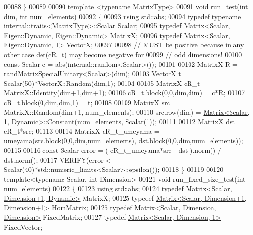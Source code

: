 \begin{DoxyCode}
00088 \}
00089 
00090 \textcolor{keyword}{template} <\textcolor{keyword}{typename} MatrixType>
00091 \textcolor{keywordtype}{void} run\_test(\textcolor{keywordtype}{int} dim, \textcolor{keywordtype}{int} num\_elements)
00092 \{
00093   \textcolor{keyword}{using} std::abs;
00094   \textcolor{keyword}{typedef} \textcolor{keyword}{typename} internal::traits<MatrixType>::Scalar Scalar;
00095   \textcolor{keyword}{typedef} \hyperlink{group___core___module_class_eigen_1_1_matrix}{Matrix<Scalar, Eigen::Dynamic, Eigen::Dynamic>} 
      MatrixX;
00096   \textcolor{keyword}{typedef} \hyperlink{group___core___module_class_eigen_1_1_matrix}{Matrix<Scalar, Eigen::Dynamic, 1>} 
      \hyperlink{group___core___module}{VectorX};
00097 
00098   \textcolor{comment}{// MUST be positive because in any other case det(cR\_t) may become negative for}
00099   \textcolor{comment}{// odd dimensions!}
00100   \textcolor{keyword}{const} Scalar c = abs(internal::random<Scalar>());
00101 
00102   MatrixX R = randMatrixSpecialUnitary<Scalar>(dim);
00103   VectorX t = Scalar(50)*VectorX::Random(dim,1);
00104 
00105   MatrixX cR\_t = MatrixX::Identity(dim+1,dim+1);
00106   cR\_t.block(0,0,dim,dim) = c*R;
00107   cR\_t.block(0,dim,dim,1) = t;
00108 
00109   MatrixX src = MatrixX::Random(dim+1, num\_elements);
00110   src.row(dim) = \hyperlink{group___core___module_class_eigen_1_1_matrix}{Matrix<Scalar, 1, Dynamic>::Constant}(num\_elements, 
      Scalar(1));
00111 
00112   MatrixX dst = cR\_t*src;
00113 
00114   MatrixX cR\_t\_umeyama = \hyperlink{group___geometry___module_ga033d6550c1fc82e232f2b4c380c19a54}{umeyama}(src.block(0,0,dim,num\_elements), dst.block(0,0,dim,num\_elements));
00115 
00116   \textcolor{keyword}{const} Scalar error = ( cR\_t\_umeyama*src - dst ).norm() / dst.norm();
00117   VERIFY(error < Scalar(40)*std::numeric\_limits<Scalar>::epsilon());
00118 \}
00119 
00120 \textcolor{keyword}{template}<\textcolor{keyword}{typename} Scalar, \textcolor{keywordtype}{int} Dimension>
00121 \textcolor{keywordtype}{void} run\_fixed\_size\_test(\textcolor{keywordtype}{int} num\_elements)
00122 \{
00123   \textcolor{keyword}{using} std::abs;
00124   \textcolor{keyword}{typedef} \hyperlink{group___core___module_class_eigen_1_1_matrix}{Matrix<Scalar, Dimension+1, Dynamic>} MatrixX;
00125   \textcolor{keyword}{typedef} \hyperlink{group___core___module_class_eigen_1_1_matrix}{Matrix<Scalar, Dimension+1, Dimension+1>} HomMatrix;
00126   \textcolor{keyword}{typedef} \hyperlink{group___core___module_class_eigen_1_1_matrix}{Matrix<Scalar, Dimension, Dimension>} FixedMatrix;
00127   \textcolor{keyword}{typedef} \hyperlink{group___core___module_class_eigen_1_1_matrix}{Matrix<Scalar, Dimension, 1>} FixedVector;

\end{DoxyCode}
